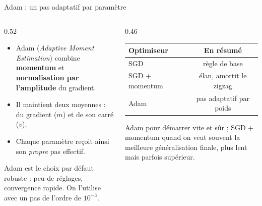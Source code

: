 \begin{frame}{Adam : un pas adaptatif par paramètre}
\begin{columns}[t]
\begin{column}{0.52\textwidth}
\begin{itemize}
  \item Adam (\emph{Adaptive Moment Estimation}) combine \textbf{momentum}
  et \textbf{normalisation par l'amplitude} du gradient.
  \item Il maintient deux moyennes : du gradient ($m$) et de son carré ($v$).
  \item Chaque paramètre reçoit ainsi son \emph{propre} pas effectif.
\end{itemize}
\begin{kbox}
Adam est le choix par défaut robuste : peu de réglages, convergence rapide.
On l'utilise avec un pas de l'ordre de $10^{-3}$.
\end{kbox}
\end{column}
\begin{column}{0.46\textwidth}
\begin{center}
\begin{tabular}{@{}lc@{}}
\toprule
\textbf{Optimiseur} & \textbf{En résumé} \\
\midrule
SGD & règle de base \\
SGD + momentum & élan, amortit le zigzag \\
Adam & pas adaptatif par poids \\
\bottomrule
\end{tabular}
\end{center}
\begin{ebox}
Adam pour démarrer vite et sûr ; SGD + momentum quand on veut souvent la
meilleure généralisation finale, plus lent mais parfois supérieur.
\end{ebox}
\end{column}
\end{columns}
\end{frame}

